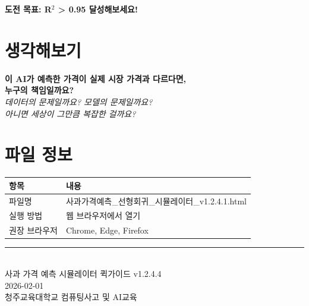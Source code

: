 \documentclass[11pt, a4paper]{article}
\begin{document}
\vspace{0.5cm}

\begin{center}
\textbf{도전 목표: R$^2$ > 0.95 달성해보세요!}
\end{center}

\section{ 생각해보기}

\begin{tcolorbox}[colback=blue!5, colframe=blueprimary, boxrule=1pt]
\begin{center}
\textbf{\large 이 AI가 예측한 가격이 실제 시장 가격과 다르다면,\\[0.3cm]
누구의 책임일까요?}\\[0.5cm]
\textit{데이터의 문제일까요? 모델의 문제일까요?\\
아니면 세상이 그만큼 복잡한 걸까요?}
\end{center}
\end{tcolorbox}

\section{ 파일 정보}

\begin{center}
\begin{tabular}{lp{10cm}}
    \toprule
    \textbf{항목} & \textbf{내용} \\
    \midrule
    파일명 & 사과가격예측\_선형회귀\_시뮬레이터\_v1.2.4.1.html \\
    실행 방법 & 웹 브라우저에서 열기 \\
    권장 브라우저 & Chrome, Edge, Firefox \\
    \bottomrule
\end{tabular}
\end{center}

\vfill
\begin{center}
\rule{0.8\textwidth}{0.5pt}\\[0.3cm]
{\small\color{textmedium}
사과 가격 예측 시뮬레이터 퀵가이드 v1.2.4.4\\
2026-02-01\\
청주교육대학교 컴퓨팅사고 및 AI교육
}
\end{center}
\end{document}
